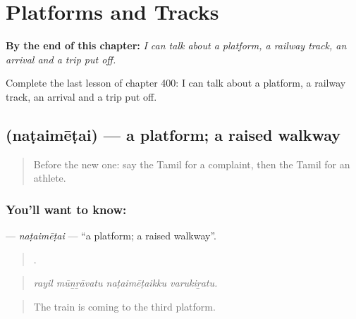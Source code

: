 
\chapter{Platforms and Tracks}
\label{ch:ta-platforms-and-tracks}

\begin{chapteropening}
\textbf{By the end of this chapter:} \emph{I can talk about a platform, a railway track, an arrival and a trip put off.}

Complete the last lesson of chapter 400: I can talk about a platform, a railway track, an arrival and a trip put off.
\end{chapteropening}

\section[\texorpdfstring{\ta{நடைமேடை} (naṭaimēṭai)}{நடைமேடை (naṭaimēṭai)}]{ (naṭaimēṭai) — a platform; a raised walkway}

\label{lesson:TA-C400-nataimetai}



\begin{quote}
Before the new one: say the Tamil for a complaint, then the Tamil for an athlete.
\end{quote}

\subsection*{You'll want to know: }
\textbf{} — \emph{naṭaimēṭai} — \textquotedblleft{}a platform; a raised walkway\textquotedblright{}.

\begin{quote}
   .
\end{quote}

\begin{quote}
\emph{rayil mūṉṟāvatu naṭaimēṭaikku varukiṟatu.}
\end{quote}

\begin{quote}
The train is coming to the third platform.
\end{quote}

